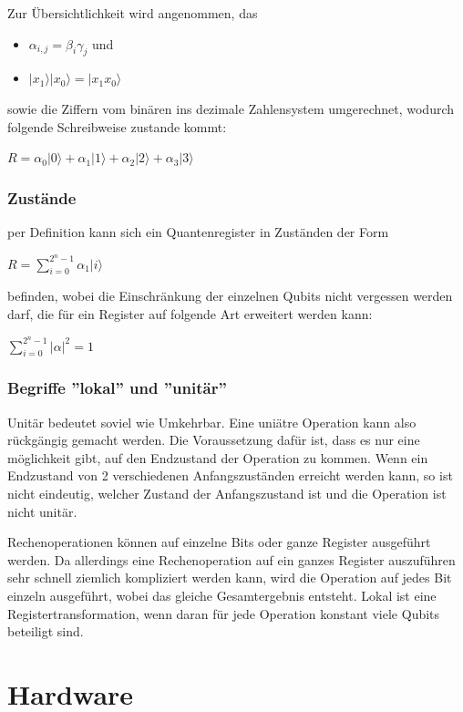 Zur Übersichtlichkeit wird angenommen, das
\begin{itemize}
	\item $\alpha_{i,j} = \beta_i\gamma_j$ und
	\item $|x_1\rangle|x_0\rangle = |x_1 x_0\rangle$
\end{itemize}
sowie die Ziffern vom binären ins dezimale Zahlensystem umgerechnet, wodurch folgende Schreibweise zustande kommt:

$R = \alpha_0|0\rangle+\alpha_1|1\rangle+\alpha_2|2\rangle+\alpha_3|3\rangle$

\subsubsection{Zustände}
\label{sec:zustande}

per Definition kann sich ein Quantenregister in Zuständen der Form

$R = \displaystyle\sum_{i=0}^{2^n-1} \alpha_1|i\rangle$

befinden, wobei die Einschränkung der einzelnen Qubits nicht vergessen werden darf, die für ein Register auf folgende Art erweitert werden kann:

$\displaystyle\sum_{i=0}^{2^n-1}  |\alpha|^2 = 1$

\subsubsection{Begriffe ''lokal'' und ''unitär''}
\label{sec:lokal_unitar}

Unitär bedeutet soviel wie Umkehrbar. Eine uniätre Operation kann also rückgängig gemacht werden. Die Voraussetzung dafür ist, dass es nur eine möglichkeit gibt, auf den Endzustand der Operation zu kommen. Wenn ein Endzustand von 2 verschiedenen Anfangszuständen erreicht werden kann, so ist nicht eindeutig, welcher Zustand der Anfangszustand ist und die Operation ist nicht unitär.

Rechenoperationen können auf einzelne Bits oder ganze Register ausgeführt werden. Da allerdings eine Rechenoperation auf ein ganzes Register auszuführen sehr schnell ziemlich kompliziert werden kann, wird die Operation auf jedes Bit einzeln ausgeführt, wobei das gleiche Gesamtergebnis entsteht. Lokal ist eine Registertransformation, wenn daran für jede Operation konstant viele Qubits beteiligt sind.

\section{Hardware}
\label{sec:hardware}

